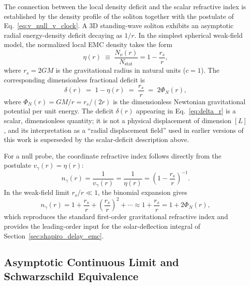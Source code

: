 \documentclass[10pt,a4paper]{article}
\begin{document}
The connection between the local density deficit and the scalar
refractive index is established by the density profile of the soliton
together with the postulate of Eq.~\eqref{eq:v_null_v_clock}. A 3D
standing-wave soliton exhibits an asymptotic radial energy-density
deficit decaying as $1/r$. In the simplest spherical weak-field
model, the normalized local EMC density takes the form
\begin{equation}
	\eta(r) \;\equiv\; \frac{N_{\nu}(r)}{N_{\text{stat}}}
	= 1 - \frac{r_s}{r},
	\label{eq:normalized_density}
\end{equation}
where $r_s = 2GM$ is the gravitational radius in natural units
($c = 1$). The corresponding dimensionless fractional deficit is
\begin{equation}
	\delta(r) \;=\; 1 - \eta(r) \;=\; \frac{r_s}{r}
	\;=\; 2\Phi_N(r),
	\label{eq:delta_r}
\end{equation}
where $\Phi_N(r) = GM/r = r_s/(2r)$ is the dimensionless Newtonian
gravitational potential per unit energy. The deficit $\delta(r)$
appearing in Eq.~\eqref{eq:delta_r} is a scalar, dimensionless
quantity; it is not a physical displacement of dimension $[L]$, and
its interpretation as a ``radial displacement field'' used in earlier
versions of this work is superseded by the scalar-deficit description
above.

For a null probe, the coordinate refractive index follows directly
from the postulate $v_\gamma(r) = \eta(r)$:
\begin{equation}
	n_\gamma(r)
	= \frac{1}{v_\gamma(r)}
	= \frac{1}{\eta(r)}
	= \left(1 - \frac{r_s}{r}\right)^{-1}.
	\label{eq:n_gamma_exact}
\end{equation}
In the weak-field limit $r_s/r \ll 1$, the binomial expansion gives
\begin{equation}
	n_\gamma(r)
	= 1 + \frac{r_s}{r} + \left(\frac{r_s}{r}\right)^{2} + \cdots
	\approx 1 + \frac{r_s}{r}
	= 1 + 2\Phi_N(r),
	\label{eq:n_weak_field_derived}
\end{equation}
which reproduces the standard first-order gravitational refractive
index and provides the leading-order input for the solar-deflection
integral of Section~\ref{sec:shapiro_delay_emc}.

\subsection{Asymptotic Continuous Limit and Schwarzschild Equivalence}
\label{sec:n_from_energy_density}
\end{document}
